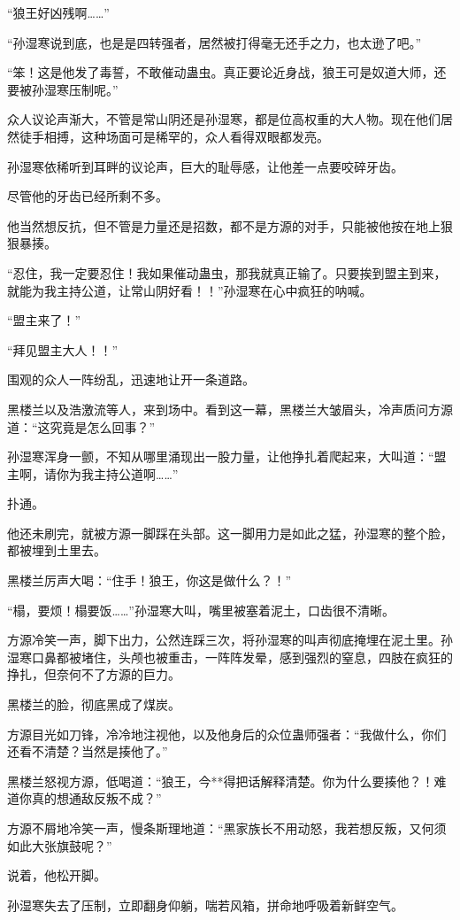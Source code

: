 \begin{this_body}
“狼王好凶残啊……”

“孙湿寒说到底，也是是四转强者，居然被打得毫无还手之力，也太逊了吧。”

“笨！这是他发了毒誓，不敢催动蛊虫。真正要论近身战，狼王可是奴道大师，还要被孙湿寒压制呢。”

众人议论声渐大，不管是常山阴还是孙湿寒，都是位高权重的大人物。现在他们居然徒手相搏，这种场面可是稀罕的，众人看得双眼都发亮。

孙湿寒依稀听到耳畔的议论声，巨大的耻辱感，让他差一点要咬碎牙齿。

尽管他的牙齿已经所剩不多。

他当然想反抗，但不管是力量还是招数，都不是方源的对手，只能被他按在地上狠狠暴揍。

“忍住，我一定要忍住！我如果催动蛊虫，那我就真正输了。只要挨到盟主到来，就能为我主持公道，让常山阴好看！！”孙湿寒在心中疯狂的呐喊。

“盟主来了！”

“拜见盟主大人！！”

围观的众人一阵纷乱，迅速地让开一条道路。

黑楼兰以及浩激流等人，来到场中。看到这一幕，黑楼兰大皱眉头，冷声质问方源道：“这究竟是怎么回事？”

孙湿寒浑身一颤，不知从哪里涌现出一股力量，让他挣扎着爬起来，大叫道：“盟主啊，请你为我主持公道啊……”

扑通。

他还未刷完，就被方源一脚踩在头部。这一脚用力是如此之猛，孙湿寒的整个脸，都被埋到土里去。

黑楼兰厉声大喝：“住手！狼王，你这是做什么？！”

“榻，要烦！榻要饭……”孙湿寒大叫，嘴里被塞着泥土，口齿很不清晰。

方源冷笑一声，脚下出力，公然连踩三次，将孙湿寒的叫声彻底掩埋在泥土里。孙湿寒口鼻都被堵住，头颅也被重击，一阵阵发晕，感到强烈的窒息，四肢在疯狂的挣扎，但奈何不了方源的巨力。

黑楼兰的脸，彻底黑成了煤炭。

方源目光如刀锋，冷冷地注视他，以及他身后的众位蛊师强者：“我做什么，你们还看不清楚？当然是揍他了。”

黑楼兰怒视方源，低喝道：“狼王，今**得把话解释清楚。你为什么要揍他？！难道你真的想通敌反叛不成？”

方源不屑地冷笑一声，慢条斯理地道：“黑家族长不用动怒，我若想反叛，又何须如此大张旗鼓呢？”

说着，他松开脚。

孙湿寒失去了压制，立即翻身仰躺，喘若风箱，拼命地呼吸着新鲜空气。


\end{this_body}
